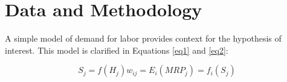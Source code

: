 


\section{Data and Methodology}

A simple model of demand for labor provides context for the hypothesis of interest.
This model is clarified in Equations \ref{eq1} and \ref{eq2}:

\begin{subequations}
    \begin{equation}
        S_j = f(H_j)
        \label{eq1}
    \end{equation}
    \begin{equation}
        w_{ij} = E_i(MRP_j) = f_i(S_j)
        \label{eq2}
    \end{equation}
\end{subequations}

